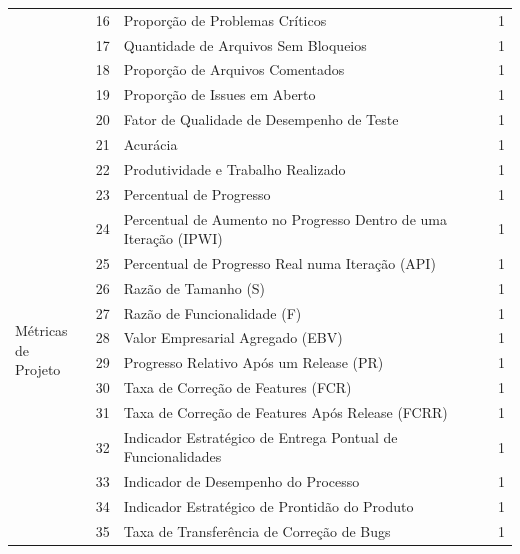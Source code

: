 \documentclass[sigconf]{acmart}
\begin{document}
\begin{table}[t]
\begin{tabular}{p{3.6cm} c p{8cm} c c}
 & 16 & Proporção de Problemas Críticos                                   & \cite{Karhapaa:2024} & 1 \\
 & 17 & Quantidade de Arquivos Sem Bloqueios                              & \cite{Karhapaa:2024} & 1 \\
 & 18 & Proporção de Arquivos Comentados                                  & \cite{Karhapaa:2024} & 1 \\
 & 19 & Proporção de Issues em Aberto                                     & \cite{Karhapaa:2024} & 1 \\
 & 20 & Fator de Qualidade de Desempenho de Teste                         & \cite{Guerrero:2022} & 1 \\
 & 21 & Acurácia                                                          & \cite{Ilays:2024}    & 1 \\

\multirow{14}{2.6cm}{\parbox{3.2cm}{Métricas de\\Projeto}}
 & 22 & Produtividade e Trabalho Realizado                                & \cite{Misra:2021}    & 1 \\
 & 23 & Percentual de Progresso                                           & \cite{Misra:2021}    & 1 \\
 & 24 & Percentual de Aumento no Progresso Dentro de uma Iteração (IPWI) & \cite{Misra:2021}    & 1 \\
 & 25 & Percentual de Progresso Real numa Iteração (API)                  & \cite{Misra:2021}    & 1 \\
 & 26 & Razão de Tamanho (S)                                              & \cite{Misra:2021}    & 1 \\
 & 27 & Razão de Funcionalidade (F)                                       & \cite{Misra:2021}    & 1 \\
 & 28 & Valor Empresarial Agregado (EBV)                                  & \cite{Misra:2021}    & 1 \\
 & 29 & Progresso Relativo Após um Release (PR)                           & \cite{Misra:2021}    & 1 \\
 & 30 & Taxa de Correção de Features (FCR)                                & \cite{Misra:2021}    & 1 \\
 & 31 & Taxa de Correção de Features Após Release (FCRR)                  & \cite{Misra:2021}    & 1 \\
 & 32 & Indicador Estratégico de Entrega Pontual de Funcionalidades       & \cite{Karhapaa:2024} & 1 \\
 & 33 & Indicador de Desempenho do Processo                               & \cite{Karhapaa:2024} & 1 \\
 & 34 & Indicador Estratégico de Prontidão do Produto                     & \cite{Karhapaa:2024} & 1 \\
 & 35 & Taxa de Transferência de Correção de Bugs                         & \cite{Karhapaa:2024} & 1 \\


\end{tabular}
\end{table}
\end{document}
